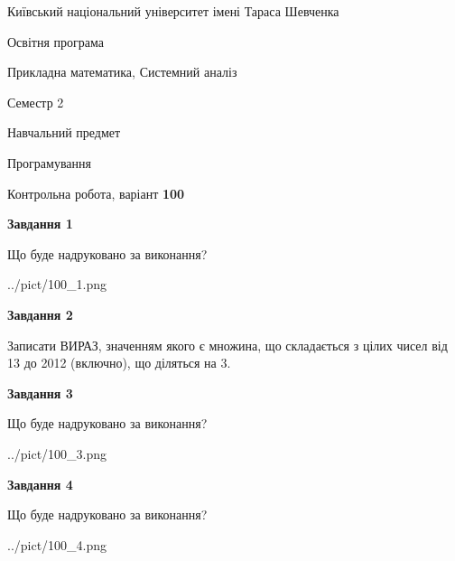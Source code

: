 \documentclass[12pt, ukrainian]{article}
\begin{document}
{{\begin {small}\par
{ \center  Київський національний університет імені Тараса Шевченка \par}
{\parbox {5 cm}{Освітня програма \hfill}{\parbox {8 cm}{Прикладна математика, Системний аналіз \hfill}}\parbox {5 cm}{\hfill Семестр 2}}\par
{\parbox {5 cm} {Навчальний предмет \hfill}\parbox {7 cm}{Програмування \hfill}\parbox {6cm}{\hfill}\par}\vspace{-7pt} \end{small}}{\center Контрольна робота, варіант  \No \textbf
{ 100 }\par}}
{
\begin {large}
{\begin {center}\textbf{Завдання 1}\end {center}}\par
Що буде надруковано за виконання?\par\par
\begin{center}
	{../pict/100_1.png}
\end{center}
\newpage

{\begin {center}\textbf{Завдання 2}\end {center}}\par
Записати ВИРАЗ, значенням якого є множина, що складається з цілих чисел від 13 до 2012 (включно), що діляться на 3.\par
\newpage

{\begin {center}\textbf{Завдання 3}\end {center}}\par
Що буде надруковано за виконання?\par
\begin{center}
	{../pict/100_3.png}
\end{center}
\newpage

{\begin {center}\textbf{Завдання 4}\end {center}}\par
Що буде надруковано за виконання?\par
\begin{center}
	{../pict/100_4.png}
\end{center}
\newpage


\end{large}}
\end{document}
